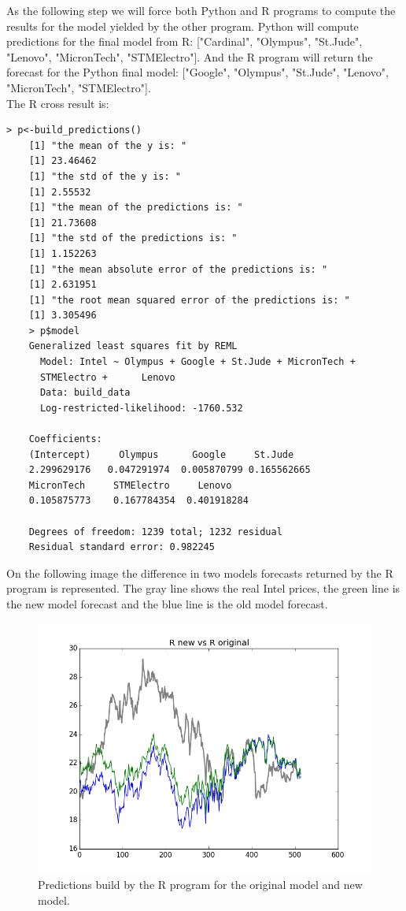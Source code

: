 \documentclass[
  twoside,
  11pt, a4paper,
  footinclude=true,
  headinclude=true,
  cleardoublepage=empty
]{scrreprt}
\begin{document}
    As the following step we will force both Python and R programs to compute the results for the model yielded by the other program. Python will compute predictions for the final model from R: ["Cardinal", "Olympus", "St.Jude", "Lenovo", "MicronTech", "STMElectro"]. And the R program will return the forecast for the Python final model: ["Google", "Olympus", "St.Jude", "Lenovo", "MicronTech", "STMElectro"].\\
    The R cross result is:
    \begin{lstlisting}[basicstyle=\footnotesize]
    > p<-build_predictions()
    [1] "the mean of the y is: "
    [1] 23.46462
    [1] "the std of the y is: "
    [1] 2.55532
    [1] "the mean of the predictions is: "
    [1] 21.73608
    [1] "the std of the predictions is: "
    [1] 1.152263
    [1] "the mean absolute error of the predictions is: "
    [1] 2.631951
    [1] "the root mean squared error of the predictions is: "
    [1] 3.305496
    > p$model
    Generalized least squares fit by REML
      Model: Intel ~ Olympus + Google + St.Jude + MicronTech + 
      STMElectro +      Lenovo 
      Data: build_data 
      Log-restricted-likelihood: -1760.532
    
    Coefficients:
    (Intercept)     Olympus      Google     St.Jude  
    2.299629176   0.047291974  0.005870799 0.165562665
    MicronTech     STMElectro     Lenovo 
    0.105875773    0.167784354  0.401918284 
    
    Degrees of freedom: 1239 total; 1232 residual
    Residual standard error: 0.982245 
    \end{lstlisting}
    On the following image the difference in two models forecasts returned by the R program is represented. The gray line shows the real Intel prices, the green line is the new model forecast and the blue line is the old model forecast.
    
    \begin{figure}[h]
        \includegraphics[scale=0.5]{img_examples/ROriginalVsRNew.png}
        \centering
        \caption{Predictions build by the R program for the original model and new model.}
        \label{fig:ROriginalVsRNew}
    \end{figure}
    
\end{document}
